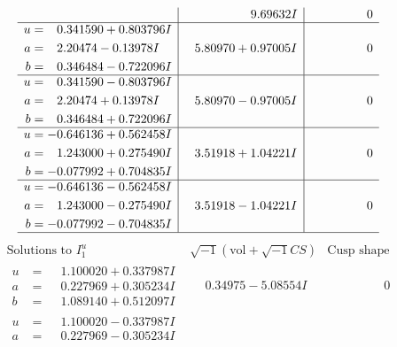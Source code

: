 \documentclass[1p]{elsarticle_modified}
\theoremstyle{definition}
\newcommand{\I}{\sqrt{-1}}
\begin{document}
$$\begin{array}{c|c|c}
 & \phantom{-0.000000 -}9.69632 I & \phantom{-0.000000 } 0 \\ \hline\begin{aligned}
u &= \phantom{-}0.341590 + 0.803796 I \\
a &= \phantom{-}2.20474 - 0.13978 I \\
b &= \phantom{-}0.346484 - 0.722096 I\end{aligned}
 & \phantom{-}5.80970 + 0.97005 I & \phantom{-0.000000 } 0 \\ \hline\begin{aligned}
u &= \phantom{-}0.341590 - 0.803796 I \\
a &= \phantom{-}2.20474 + 0.13978 I \\
b &= \phantom{-}0.346484 + 0.722096 I\end{aligned}
 & \phantom{-}5.80970 - 0.97005 I & \phantom{-0.000000 } 0 \\ \hline\begin{aligned}
u &= -0.646136 + 0.562458 I \\
a &= \phantom{-}1.243000 + 0.275490 I \\
b &= -0.077992 + 0.704835 I\end{aligned}
 & \phantom{-}3.51918 + 1.04221 I & \phantom{-0.000000 } 0 \\ \hline\begin{aligned}
u &= -0.646136 - 0.562458 I \\
a &= \phantom{-}1.243000 - 0.275490 I \\
b &= -0.077992 - 0.704835 I\end{aligned}
 & \phantom{-}3.51918 - 1.04221 I & \phantom{-0.000000 } 0\\
 \hline 
 \end{array}$$\newpage$$\begin{array}{c|c|c}  
\text{Solutions to }I^u_{1}& \I (\text{vol} + \sqrt{-1}CS) & \text{Cusp shape}\\
 \hline 
\begin{aligned}
u &= \phantom{-}1.100020 + 0.337987 I \\
a &= \phantom{-}0.227969 + 0.305234 I \\
b &= \phantom{-}1.089140 + 0.512097 I\end{aligned}
 & \phantom{-}0.34975 - 5.08554 I & \phantom{-0.000000 } 0 \\ \hline\begin{aligned}
u &= \phantom{-}1.100020 - 0.337987 I \\
a &= \phantom{-}0.227969 - 0.305234 I \\

\end{aligned}
\end{array}$$
\end{document}

